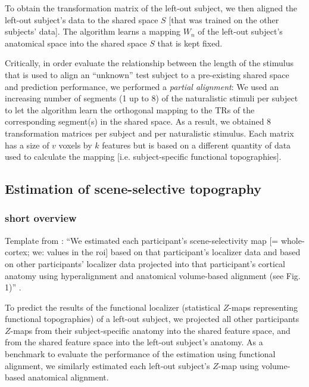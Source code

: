 %
To obtain the transformation matrix of the left-out subject, we then aligned the
left-out subject's data to the shared space $S$ [that was trained on the other
subjects' data].
%
The algorithm learns a mapping $W_{n}$ of the left-out subject's anatomical
space into the shared space $S$ that is kept fixed.

%
Critically, in order evaluate the relationship between the length of the
stimulus that is used to align an ``unknown'' test subject to a pre-existing
shared space and prediction performance, we performed a \textit{partial
alignment}:
%
We used an increasing number of segments (1 up to 8) of the naturalistic stimuli
per subject to let the algorithm learn the orthogonal mapping to the TRs of the
corresponding segment(s) in the shared space.
%
As a result, we obtained 8 transformation matrices per subject and per
naturalistic stimulus.
%
Each matrix has a size of $v$ voxels by $k$ features but is based on a different
quantity of data used to calculate the mapping [i.e. subject-specific functional
topographies].


\subsection{Estimation of scene-selective topography}





\subsubsection{short overview}

%
Template from \citet{jiahui2020predicting}: ``We estimated each participant's
scene-selectivity map [= whole-cortex; we: values in the \ac{roi}] based on that
participant's localizer data and based on other participants' localizer data
projected into that participant's cortical anatomy using hyperalignment and
anatomical volume-based alignment (see Fig. 1)'' \citep{jiahui2020predicting}.

%
To predict the results of the functional localizer (statistical $Z$-maps
representing functional topographies) of a left-out subject, we projected all
other participants $Z$-maps from their subject-specific anatomy into the shared
feature space, and from the shared feature space into the left-out subject's
anatomy.
%
As a benchmark to evaluate the performance of the estimation using functional
alignment, we similarly estimated each left-out subject's $Z$-map using
volume-based anatomical alignment.

